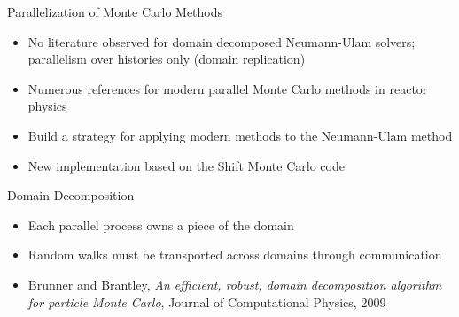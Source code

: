 \documentclass{beamer}
\begin{document}
\begin{frame}{Parallelization of Monte Carlo Methods}

  \begin{itemize}
  \item No literature observed for domain decomposed Neumann-Ulam
    solvers; parallelism over histories only (domain replication)
    \medskip \medskip
  \item Numerous references for modern parallel Monte Carlo methods in
    reactor physics
    \medskip \medskip
  \item Build a strategy for applying modern methods to the
    Neumann-Ulam method
  \item New implementation based on the Shift Monte Carlo code
  \end{itemize}

\end{frame}

\begin{frame}{Domain Decomposition}

  \begin{itemize}
  \item Each parallel process owns a piece of the domain
  \item Random walks must be transported across domains through
    communication
  \item Brunner and Brantley, \textit{An efficient, robust, domain
    decomposition algorithm for particle Monte Carlo}, Journal of
    Computational Physics, 2009
  \end{itemize}

  \begin{figure}[htpb!]
    \begin{center}
      \scalebox{1.0}{  }
    \end{center}
  \end{figure}

\end{frame}
\end{document}
